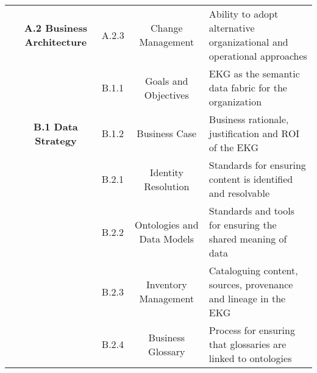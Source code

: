 \begin{table}[ht]
\begin{tabular}{@{}cclcl@{}}
    \multirow{-6}{*}{\cellcolor[HTML]{548135}{
        \rotatebox{90}{\textbf{A. BUSINESS}}}}                            & \multirow{-3}{*}{\cellcolor[HTML]{A8D08D}\textbf{A.2 Business Architecture}}       & \cellcolor[HTML]{C5E0B3}A.2.3 & \cellcolor[HTML]{C5E0B3}Change Management            & \cellcolor[HTML]{E2EFD9}Ability to adopt alternative organizational and operational approaches \\
    \cellcolor[HTML]{2F5496}{}                                            & \cellcolor[HTML]{8EAADB}                                                           & \cellcolor[HTML]{B4C6E7}B.1.1 & \cellcolor[HTML]{B4C6E7}Goals and Objectives         & \cellcolor[HTML]{D9E2F3}EKG as the semantic data fabric for the organization                   \\
    \cellcolor[HTML]{2F5496}{}                                            & \multirow{-2}{*}{\cellcolor[HTML]{8EAADB}\textbf{B.1 Data Strategy}}               & \cellcolor[HTML]{B4C6E7}B.1.2 & \cellcolor[HTML]{B4C6E7}Business Case                & \cellcolor[HTML]{D9E2F3}Business rationale, justification and ROI of the EKG                   \\
    \cellcolor[HTML]{2F5496}{}                                            & \cellcolor[HTML]{8EAADB}                                                           & \cellcolor[HTML]{B4C6E7}B.2.1 & \cellcolor[HTML]{B4C6E7}Identity Resolution          & \cellcolor[HTML]{D9E2F3}Standards for ensuring content is identified and resolvable            \\
    \cellcolor[HTML]{2F5496}{}                                            & \cellcolor[HTML]{8EAADB}                                                           & \cellcolor[HTML]{B4C6E7}B.2.2 & \cellcolor[HTML]{B4C6E7}Ontologies and Data Models   & \cellcolor[HTML]{D9E2F3}Standards and tools for ensuring the shared meaning of data            \\
    \cellcolor[HTML]{2F5496}{}                                            & \cellcolor[HTML]{8EAADB}                                                           & \cellcolor[HTML]{B4C6E7}B.2.3 & \cellcolor[HTML]{B4C6E7}Inventory Management         & \cellcolor[HTML]{D9E2F3}Cataloguing content, sources, provenance and lineage in the EKG        \\
    \cellcolor[HTML]{2F5496}{}                                            & \cellcolor[HTML]{8EAADB}                                                           & \cellcolor[HTML]{B4C6E7}B.2.4 & \cellcolor[HTML]{B4C6E7}Business Glossary            & \cellcolor[HTML]{D9E2F3}Process for ensuring that glossaries are linked to ontologies          \\

\end{tabular}
\end{table}
